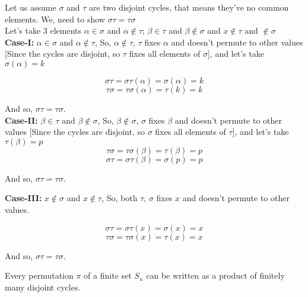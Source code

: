 \begin{proofcustom}
    Let us assume $\sigma$ and $\tau$ are two disjoint cycles, that means they've no common elements. 
    We, need to show $\boxed{\sigma\tau = \tau\sigma}$\\
    Let's take 3 elements $\alpha \in \sigma$ and  $\alpha \notin \tau$; $\beta \in \tau$ and  $\beta \notin \sigma$ and $x \notin \tau$ and $\notin \sigma$ \\

    \textbf{Case-I:} \hspace{0.5cm}  $\alpha \in \sigma$ and  $\alpha \notin \tau$, So, $\alpha \notin \tau$, $\tau$ fixes $\alpha$ and doesn't permute to other values [Since the cycles are disjoint, so $\tau$ fixes all elements of $\sigma$], and let's take $\sigma(\alpha) = k$

    $$\sigma\tau=\sigma\tau(\alpha)=\sigma(\alpha)=k$$
    $$\tau\sigma=\tau \sigma(\alpha)=\tau(k)=k
    $$

    And so, $\boxed{\sigma\tau=\tau\sigma}$. \\ 
\textbf{Case-II:}\hspace{0.5cm} $\beta \in \tau$ and  $\beta \notin \sigma$, So, $\beta \notin \sigma$, $\sigma$ fixes $\beta$ and doesn't permute to other values [Since the cycles are disjoint, so $\sigma$ fixes all elements of $\tau$], and let's take $\tau(\beta) = p$
 $$\tau\sigma=\tau \sigma(\beta)=\tau(\beta)=p
    $$
    $$\sigma\tau=\sigma\tau(\beta)=\sigma(p)=p$$
   

    And so, $\boxed{\sigma\tau=\tau\sigma}$. 

   \textbf{Case-III:}\hspace{0.5cm} $x \notin \sigma$ and  $x \notin \tau$, So, both $\tau$, $\sigma$ fixes $x$ and doesn't permute to other values. 
 
    
    $$\sigma\tau=\sigma\tau(x)=\sigma(x)=x$$
   $$\tau\sigma=\tau \sigma(x)=\tau(x)=x$$

    And so, $\boxed{\sigma\tau=\tau\sigma}$.  
    
\end{proofcustom}
\newpage
\begin{theorem}
Every permutation $\pi$ of a finite set $S_n$ can be written as a product of finitely many disjoint cycles.
\end{theorem}
